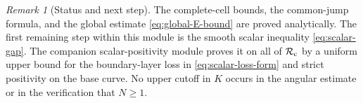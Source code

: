 \documentclass[11pt]{article}
\theoremstyle{remark}
\newtheorem{remark}[lemma]{Remark}
\begin{document}
\begin{remark}[Status and next step]
The complete-cell bounds, the common-jump formula, and the global estimate
\eqref{eq:global-E-bound} are proved analytically.  The first remaining
step within this module is the smooth scalar inequality
\eqref{eq:scalar-gap}.  The companion scalar-positivity module proves it on
all of $\mathcal R_{\rm c}$ by a uniform upper bound for the boundary-layer
loss in \eqref{eq:scalar-loss-form} and strict positivity on the base curve.
No upper cutoff in $K$ occurs in the angular estimate or in the verification
that $N\geq1$.
\end{remark}
\end{document}
